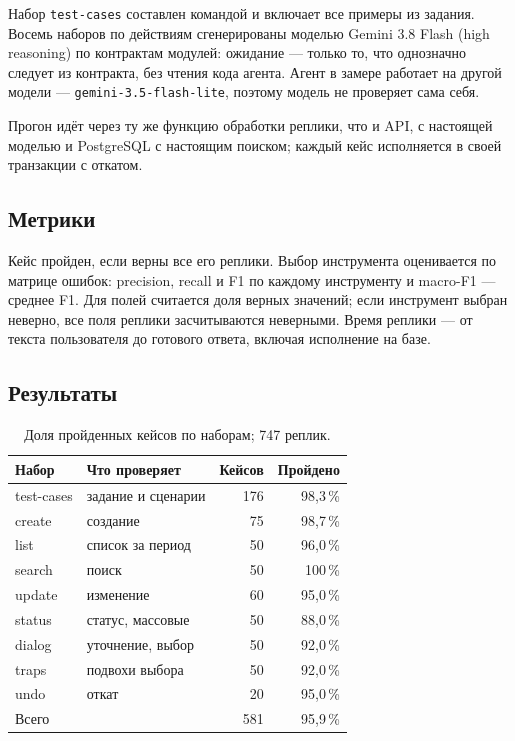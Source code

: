 \documentclass[10pt,a4paper,twocolumn]{article}
\newcommand{\code}[1]{\texttt{#1}}
\begin{document}
Набор \code{test-cases} составлен командой и включает все примеры из задания. Восемь
наборов по действиям сгенерированы моделью Gemini 3.8 Flash (high reasoning) по
контрактам модулей: ожидание — только то, что однозначно следует из контракта, без
чтения кода агента. Агент в замере работает на другой модели —
\code{gemini-3.5-flash-lite}, поэтому модель не проверяет сама себя.

Прогон идёт через ту же функцию обработки реплики, что и API, с настоящей моделью и
PostgreSQL с настоящим поиском; каждый кейс исполняется в своей транзакции с откатом.

\subsection{Метрики}

Кейс пройден, если верны все его реплики. Выбор инструмента оценивается по матрице
ошибок: precision, recall и F1 по каждому инструменту и macro-F1 — среднее F1. Для
полей считается доля верных значений; если инструмент выбран неверно, все поля реплики
засчитываются неверными. Время
реплики — от текста пользователя до готового ответа, включая исполнение на базе.

\subsection{Результаты}

\begin{table}[t]
\centering\small
\begin{tabularx}{\columnwidth}{@{}lLrr@{}}
\toprule
Набор & Что проверяет & Кейсов & Пройдено \\
\midrule
test-cases & задание и сценарии & 176 & 98,3\,\% \\
create & создание & 75 & 98,7\,\% \\
list & список за период & 50 & 96,0\,\% \\
search & поиск & 50 & 100\,\% \\
update & изменение & 60 & 95,0\,\% \\
status & статус, массовые & 50 & 88,0\,\% \\
dialog & уточнение, выбор & 50 & 92,0\,\% \\
traps & подвохи выбора & 50 & 92,0\,\% \\
undo & откат & 20 & 95,0\,\% \\
\midrule
Всего & & 581 & 95,9\,\% \\
\bottomrule
\end{tabularx}
\caption{Доля пройденных кейсов по наборам; 747 реплик.}
\label{tab:datasets}
\end{table}
\end{document}
